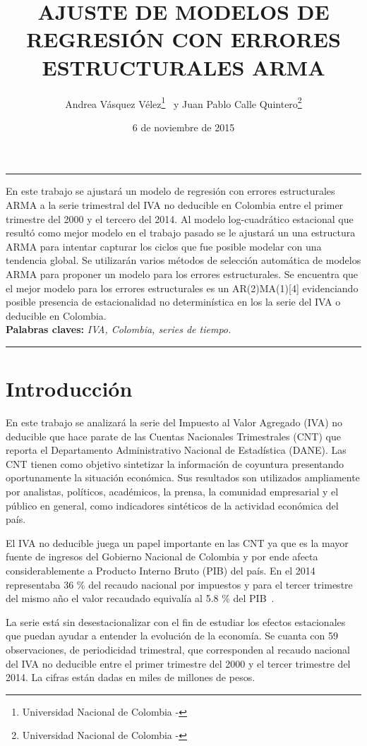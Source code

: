\documentclass[11pt, letterpaper, twoside]{article}
\title{\textbf{AJUSTE DE MODELOS DE REGRESIÓN CON ERRORES ESTRUCTURALES ARMA}}
\author{Andrea Vásquez Vélez\footnote{Universidad Nacional de Colombia - \text{anvasquez@unal.edu.co}} \, y Juan Pablo Calle Quintero\footnote{Universidad Nacional de Colombia - \text{jpcalleq@unal.edu.co}}}
\date{6 de noviembre de 2015}
\providecommand{\keywords}[1]{\textbf{Palabras claves:} #1}
\renewenvironment{abstract}
  {\small\quotation
  {\bfseries\noindent{\abstractname}\par\nobreak\smallskip}}
  {\endquotation}
\begin{document}
\maketitle

\hrule
\begin{abstract}
\noindent En este trabajo se ajustará un modelo de regresión con errores estructurales ARMA a la serie trimestral del IVA  no deducible en Colombia entre el primer trimestre del 2000 y el tercero del 2014. Al modelo log-cuadrático estacional que resultó como mejor modelo en el trabajo pasado se le ajustará un una estructura ARMA para intentar capturar los ciclos que fue posible modelar con una tendencia global. Se utilizarán varios métodos de selección automática de modelos ARMA para proponer un modelo para los errores estructurales. Se encuentra que el mejor modelo para los errores estructurales es un AR(2)MA(1)[4] evidenciando posible presencia de estacionalidad no determinística en los la serie del IVA o deducible en Colombia.\\

\noindent \keywords{\textit{IVA, Colombia, series de tiempo.}}

\end{abstract}
\hrule


\section*{Introducción}

En este trabajo se analizará la serie del Impuesto al Valor Agregado (IVA) no deducible que hace parate de las Cuentas Nacionales Trimestrales (CNT) que reporta el Departamento Administrativo Nacional de Estadística (DANE). Las CNT tienen como objetivo sintetizar la información de coyuntura presentando oportunamente la situación económica. Sus resultados son utilizados ampliamente por analistas, políticos, académicos, la prensa, la comunidad empresarial y el público en general, como indicadores sintéticos de la actividad económica del país.~\cite{dane-cnt}

El IVA no deducible juega un papel importante en las CNT ya que es la mayor fuente de ingresos del Gobierno Nacional de Colombia y por ende afecta considerablemente a Producto Interno Bruto (PIB) del país. En el 2014 representaba 36 \% del recaudo nacional por impuestos y para el tercer trimestre del mismo año el valor recaudado equivalía al 5.8 \% del PIB~\cite{desaf-fisc-col}.

La serie está sin desestacionalizar con el fin de estudiar los efectos estacionales que puedan ayudar a entender la evolución de la economía. Se cuanta con 59 observaciones, de periodicidad trimestral, que corresponden al recaudo nacional del IVA no deducible entre el primer trimestre del 2000 y el tercer trimestre del 2014. La cifras están dadas en miles de millones de pesos.
\end{document}
